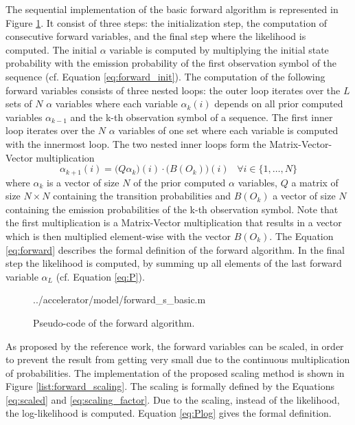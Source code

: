 \documentclass[mscthesis]{usiinfthesis}
\begin{document}
The sequential implementation of the basic forward algorithm is represented in
Figure \ref{list:forward_basic}. It consist of three steps: the initialization
step, the computation of consecutive forward variables, and the final step
where the likelihood is computed. The initial $ \alpha $ variable is computed
by multiplying the initial state probability with the emission probability of
the first observation symbol of the sequence (cf. Equation
\ref{eq:forward_init}). The computation of the following forward variables
consists of three nested loops: the outer loop iterates over the $ L $ sets of
$ N $ $ \alpha $ variables where each variable $\alpha_k(i)$ depends on all
prior computed variables $\alpha_{k-1}$ and the k-th observation symbol of
a sequence. The first inner loop iterates over the $ N $ $ \alpha $ variables
of one set where each variable is computed with the innermost loop. The two
nested inner loops form the Matrix-Vector-Vector multiplication
\begin{equation}
    \label{eq:mvv}
    \alpha_{k+1}(i) = \big(Q \alpha_k\big)(i) \cdot \big(B(O_k)\big)(i) \;\;\;
        \forall i \in \{1, \dots, N\}
\end{equation}
where $ \alpha_k $ is a vector of size $ N $ of the prior computed $ \alpha
$ variables, $ Q $ a matrix of size $ N \times N $ containing the transition
probabilities and $ B(O_k) $ a vector of size $ N $ containing the emission
probabilities of the k-th observation symbol. Note that the first
multiplication is a Matrix-Vector multiplication that results in a vector
which is then multiplied element-wise with the vector $ B(O_k) $. The Equation
\ref{eq:forward} describes the formal definition of the forward algorithm. In
the final step the likelihood is computed, by summing up all elements of the
last forward variable $ \alpha_L $ (cf. Equation \ref{eq:P}).

\begin{figure}
    \centering
    
        {../accelerator/model/forward_s_basic.m}
    \caption{Pseudo-code of the forward algorithm.}
    \label{list:forward_basic}
\end{figure}

As proposed by the reference work, the forward variables can be scaled, in
order to prevent the result from getting very small due to the continuous
multiplication of probabilities. The implementation of the proposed scaling
method is shown in Figure \ref{list:forward_scaling}. The scaling is formally
defined by the Equations \ref{eq:scaled} and \ref{eq:scaling_factor}. Due to the
scaling, instead of the likelihood, the log-likelihood is computed. Equation
\ref{eq:Plog} gives the formal definition.
\end{document}
